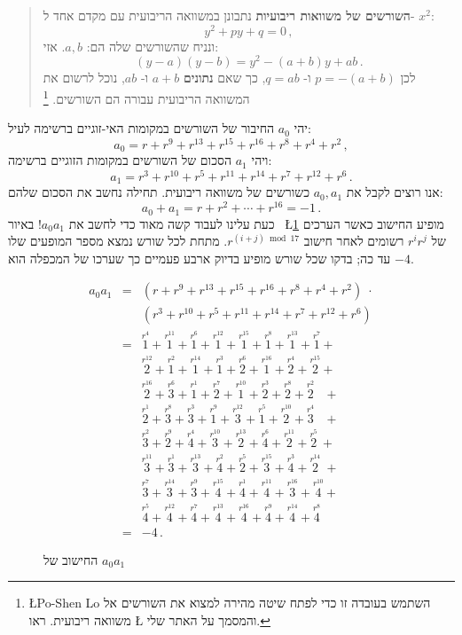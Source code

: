 \documentclass[11pt,a4paper]{article}
\newenvironment{form}[1]{%
\begin{displaymath}%
\renewcommand{\arraystretch}{#1}%
\begin{array}{lcl}}%
{\end{array}%
\end{displaymath}%
}
\newcommand*{\occ}[2]{%
  \stackrel{%
    \textstyle r^{#1}}%
    {\!\!\!\scriptscriptstyle #2}}
\begin{document}
\begin{quote}
\textbf{%
השורשים של משוואות ריבועיות%
}
נתבונן במשוואה הריבועית עם מקדם אחד ל-%
$x^2$:
\[
y^2+py+q=0\,,
\]
ונניח שהשורשים שלה הם:
$a,b$.
אזי:
\[
(y-a)(y-b)=y^2 - (a+b)y + ab\,.
\]
לכן
$p=-(a+b)$
ו-%
$q=ab$,
כך שאם
\textbf{נתונים}
$a+b$
ו-%
$ab$,
נוכל לרשום את המשוואה הריבועית עבורה הם השורשים.%
\footnote{%
\L{Po-Shen Lo}
השתמש בעובדה זו כדי לפתח שיטה מהירה למצוא את השורשים אל משוואה ריבועית. ראו
\L{\cite{lo}}
והמסמך על האתר שלי.
}
\end{quote}
יהי
$a_0$
החיבור של השורשים במקומות האי-זוגיים ברשימה לעיל:
\[
a_0=r + r^9 + r^{13} +r^{15} +r^{16} + r^8+r^4+r^2\,,
\]
ויהי
$a_1$
הסכום של השורשים במקומות הזוגיים ברשימה:
\[
a_1=r^3 + r^{10} + r^{5} +r^{11} +r^{14} + r^7+r^{12}+r^6\,.
\]
אנו רוצים לקבל את
$a_0,a_1$
כשורשים של משוואה ריבועית. תחילה נחשב את הסכום שלהם:
\[
a_0+a_1=r + r^2 + \cdots +r^{16}=-1\,.
\]
כעת עלינו לעבוד קשה מאוד כדי לחשב את
$a_0a_1$!
באיור%
~\L{\ref{fig.a0a1}}
מופיע החישוב כאשר הערכים של
$r^ir^j$
רשומים לאחר חישוב
$r^{(i+j) \bmod 17}$.
מתחת לכל שורש נמצא מספר המופעים שלו עד כה;
בדקו שכל שורש מופיע בדיוק ארבע פעמיים כך שערכו של המכפלה הוא 
$-4$.
\begin{figure}[tb]
\begin{form}{1.5}
a_0a_1&=&(r + r^9 + r^{13} +r^{15} +r^{16} + r^8+r^4+r^2)\;\cdot\\
&&(r^3 + r^{10} + r^{5} +r^{11} +r^{14} + r^7+r^{12}+r^6)\\
&=&\occ{4}{1} + \occ{11}{1} + \occ{6}{1} + \occ{12}{1} + \occ{15}{1} + \occ{8}{1} + \occ{13}{1} + \occ{7}{1} +\\

&&\occ{12}{2} + \occ{2}{1} + \occ{14}{1} + \occ{3}{1} + \occ{6}{2} + \occ{16}{1} + \occ{4}{2} + \occ{15}{2} +\\

&&\occ{16}{2} + \occ{6}{3} + \occ{1}{1} + \occ{7}{2} + \occ{10}{1} + \occ{3}{2} + \occ{8}{2} + \occ{2}{2}\;\;\: +\\

&&\occ{1}{2} + \occ{8}{3} + \occ{3}{3} + \occ{9}{1} + \occ{12}{3} + \occ{5}{1} + \occ{10}{2} + \occ{4}{3}\;\;\: +\\

&&\occ{2}{3} + \occ{9}{2} + \occ{4}{4} + \occ{10}{3} + \occ{13}{2} + \occ{6}{4} + \occ{11}{2} + \occ{5}{2} \:+\\

&&\occ{11}{3} + \occ{1}{3} + \occ{13}{3} + \occ{2}{4} + \occ{5}{2} + \occ{15}{3} + \occ{3}{4} + \occ{14}{2} \;+\\

&&\occ{7}{3} + \occ{14}{3} + \occ{9}{3} + \occ{15}{4} + \occ{1}{4} + \occ{11}{4} + \occ{16}{3} + \occ{10}{4} +\\

&&\occ{5}{4} + \occ{12}{4} + \occ{7}{4} + \occ{13}{4} + \occ{16}{4} + \occ{9}{4} + \occ{14}{4} + \occ{8}{4}\\
&=&-4\,.
\end{form}\vspace{-2em}
\caption{החישוב של $a_0a_1$}\label{fig.a0a1}
\end{figure}
\end{document}
